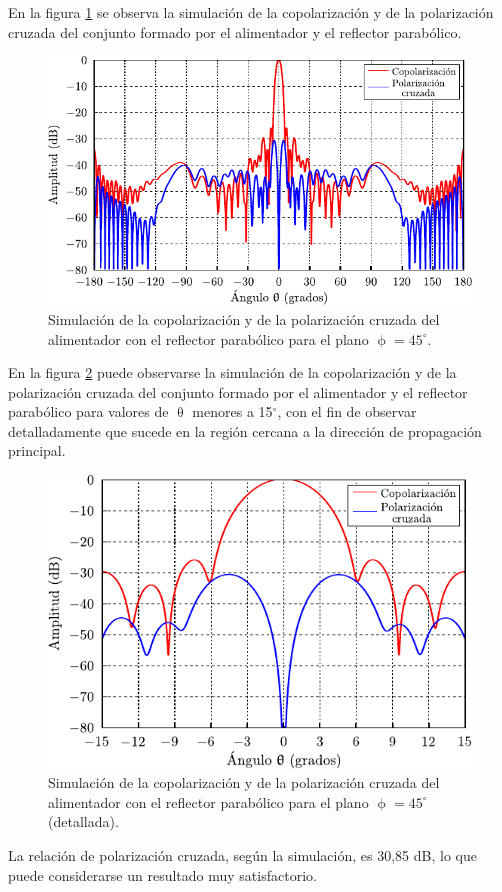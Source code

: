 En la figura \ref{fig_resultados:24} se observa la simulación de la copolarización y de la polarización cruzada del conjunto formado por el alimentador y el reflector parabólico.
\begin{figure}[H]
\centering
\includegraphics[scale = 1]{Figures/Resultados/resultados_24}
\caption{Simulación de la copolarización y de la polarización cruzada del alimentador con el reflector parabólico para el plano $\upphi = 45^{\circ}$.}
\label{fig_resultados:24}
\end{figure}
En la figura \ref{fig_resultados:25} puede observarse la simulación de la copolarización y de la polarización cruzada del conjunto formado por el alimentador y el reflector parabólico para valores de $\uptheta$ menores a 15$^{\circ}$, con el fin de observar detalladamente que sucede en la región cercana a la dirección de propagación principal.
\begin{figure}[H]
\centering
\includegraphics[scale = 1]{Figures/Resultados/resultados_25}
\caption{Simulación de la copolarización y de la polarización cruzada del alimentador con el reflector parabólico para el plano $\upphi = 45^{\circ}$ (detallada).}
\label{fig_resultados:25}
\end{figure}
La relación de polarización cruzada, según la simulación, es 30,85 dB, lo que puede considerarse un resultado muy satisfactorio.

